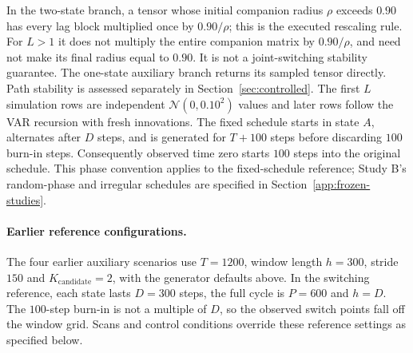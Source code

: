 \documentclass[11pt]{article}
\begin{document}
In the two-state branch, a tensor whose initial companion radius $\rho$ exceeds
$0.90$ has every lag block multiplied once by $0.90/\rho$; this is the executed
rescaling rule. For $L>1$ it does not multiply the entire companion matrix by
$0.90/\rho$, and need not make its final radius equal to $0.90$.
It is not a joint-switching stability guarantee. The one-state auxiliary branch
returns its sampled tensor directly. Path stability is assessed separately in
Section~\ref{sec:controlled}. The first $L$ simulation rows are independent
$\mathcal N(0,0.10^2)$ values and later rows follow the VAR recursion with fresh
innovations. The fixed schedule starts in state $A$, alternates after $D$ steps,
and is generated for $T+100$ steps before discarding $100$ burn-in steps.
Consequently observed time zero starts $100$ steps into the original schedule.
This phase convention applies to the fixed-schedule reference; Study B's
random-phase and irregular schedules are specified in Section~\ref{app:frozen-studies}.

\paragraph{Earlier reference configurations.}
The four earlier auxiliary scenarios use $T{=}1200$, window length $h{=}300$,
stride $150$ and $K_{\mathrm{candidate}}{=}2$, with the generator defaults above.
In the switching reference, each state lasts $D{=}300$ steps, the full cycle is
$P{=}600$ and $h=D$. The $100$-step burn-in is not a multiple of $D$, so the
observed switch points fall off the window grid. Scans and control conditions
override these reference settings as specified below.
\end{document}
